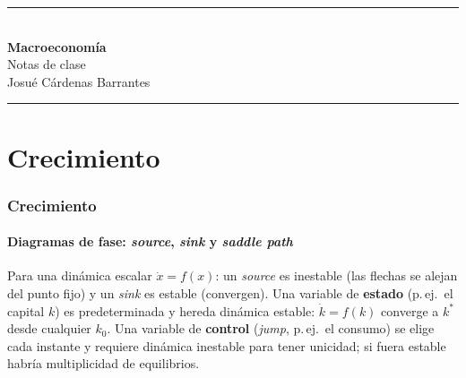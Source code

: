 \documentclass[11pt]{article}
\theoremstyle{definition}
\begin{document}
\begin{titlepage}
\thispagestyle{empty}
\vspace*{3.5cm}
\begin{center}
\rule{\textwidth}{1pt}\\[1.1cm]
{\Huge\bfseries Macroeconomía}\\[0.6cm]
{\Large Notas de clase}\\[0.35cm]
{\large Josué Cárdenas Barrantes}\\[1.0cm]
\rule{\textwidth}{1pt}
\end{center}
\vfill
\end{titlepage}

\newpage
\tableofcontents
\thispagestyle{empty}
\newpage
\setcounter{page}{1}

\part{Crecimiento}

\section{Crecimiento}

\subsection{Diagramas de fase: \emph{source}, \emph{sink} y \emph{saddle path}}

Para una dinámica escalar $\dot{x}=f(x)$: un \emph{source} es inestable (las flechas se alejan del
punto fijo) y un \emph{sink} es estable (convergen). Una variable de \textbf{estado} (p.\,ej.\ el
capital $k$) es predeterminada y hereda dinámica estable: $\dot{k}=f(k)$ converge a $k^{\ast}$ desde
cualquier $k_{0}$. Una variable de \textbf{control} (\emph{jump}, p.\,ej.\ el consumo) se elige cada
instante y requiere dinámica inestable para tener unicidad; si fuera estable habría multiplicidad de
equilibrios.
\end{document}
